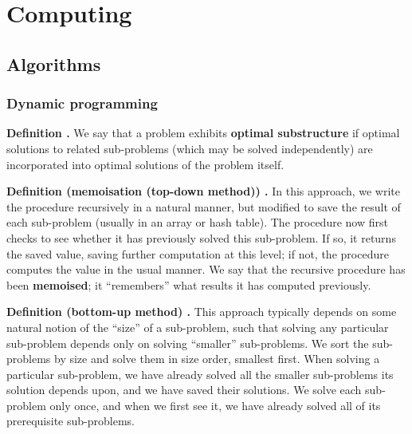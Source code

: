 \chapter{Computing}

\section{Algorithms}
\subsection{Dynamic programming}

\begin{shaded}
\textbf{Definition \cite{clrs_algorithms}.} We say that a problem exhibits \textbf{optimal substructure} if optimal solutions to related sub-problems (which may be solved independently) are incorporated into optimal solutions of the problem itself.
\end{shaded}

\begin{shaded}
\textbf{Definition (memoisation (top-down method)) \cite{clrs_algorithms}.} In this approach, we write the procedure recursively in a natural manner, but modified to save the result of each sub-problem (usually in an array or hash table). The procedure now first checks to see whether it has previously solved this sub-problem. If so, it returns the saved value, saving further computation at this level; if not, the procedure computes the value in the usual manner. We say that the recursive procedure has been \textbf{memoised}; it ``remembers'' what results it has computed previously.
\end{shaded}

\begin{shaded}
\textbf{Definition (bottom-up method) \cite{clrs_algorithms}.} This approach typically depends on some natural notion of the ``size'' of a sub-problem, such that solving any particular sub-problem depends only on solving ``smaller'' sub-problems. We sort the sub-problems by size and solve them in size order, smallest first. When solving a particular sub-problem, we have already solved all the smaller sub-problems its solution depends upon, and we have saved their solutions. We  solve each sub-problem only once, and when we first see it, we have already solved all of its prerequisite sub-problems.
\end{shaded}

